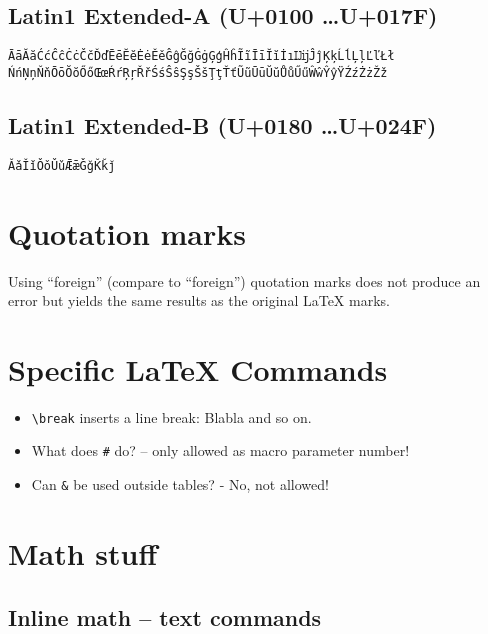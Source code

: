 \documentclass[a4paper]{article}
\begin{document}
\subsection{Latin1 Extended-A (U+0100 \ldots U+017F)}

\begin{verbatim}
ĀāĂăĆćĈĉĊċČčĎďĒēĔĕĖėĚěĜĝĞğĠġĢģĤĥĨĩĪīĬĭİıĲĳĴĵĶķĹĺĻļĽľŁł
ŃńŅņŇňŌōŎŏŐőŒœŔŕŖŗŘřŚśŜŝŞşŠšŢţŤťŨũŪūŬŭŮůŰűŴŵŶŷŸŹźŻżŽž
\end{verbatim}


\subsection{Latin1 Extended-B (U+0180 \ldots U+024F)}

\begin{verbatim}
ǍǎǏǐǑǒǓǔǢǣǦǧǨǩǰ
\end{verbatim}



\section{Quotation marks}

Using “foreign” (compare to ``foreign'') quotation marks does not produce an error but yields
the same results as the original LaTeX marks.



\section{Specific LaTeX Commands}

\begin{itemize}
\item \verb!\break! inserts a line break: Blabla \hfil\break and so on.
\item What does \verb!#! do? -- only allowed as macro parameter number!
\item Can \verb!&! be used outside tables? - No, not allowed!
\end{itemize}


\section{Math stuff}

\subsection{Inline math -- text commands}
\end{document}
